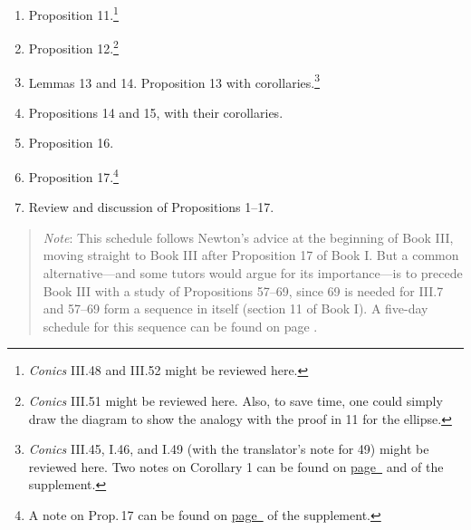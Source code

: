 \documentclass[10pt]{article}
\begin{document}
\begin{enumerate}[resume*] \item Proposition
		11.\footnote{\emph{Conics} III.48 and III.52
			might be reviewed here.} \item
		Proposition 12.\footnote{\emph{Conics}
			III.51 might be reviewed here. Also,
			to save time, one could simply draw
			the diagram to show the analogy with
			the proof in 11 for the ellipse.}
	\item Lemmas 13 and 14. Proposition 13 with
		corollaries.\footnote{\emph{Conics} III.45,
			I.46, and I.49 (with the
			translator's note for 49) might be
			reviewed here. Two notes on Corollary 1 can be
			found on \hyperref[supple.96]{page~\pageref{supple.96}} and \hyperref[supple.98]{\pageref{supple.98}} of the supplement.} \item Propositions
		14 and 15, with their corollaries.  \item
		Proposition 16.  \item Proposition 17.\footnote{A
		note on Prop.\,17 can be found on \hyperref[supple.99]{page~\pageref{supple.99}} of the supplement.}
	\item Review and discussion of Propositions 1--17.
\end{enumerate}
\vspace{-0.5em} 
\begin{quote} \small{\emph{Note}: This
		schedule follows Newton's advice at the
		beginning of Book III, moving straight to
		Book III after Proposition 17 of Book I. But
		a common alternative---and some tutors would
		argue for its importance---is to precede
		Book III with a study of Propositions
		57--69, since 69 is needed for III.7 and
		57--69 form a sequence in itself (section 11
		of Book I). A five-day schedule for this
		sequence can be found on page
		\pageref{Newton}.} \end{quote}
\end{document}
